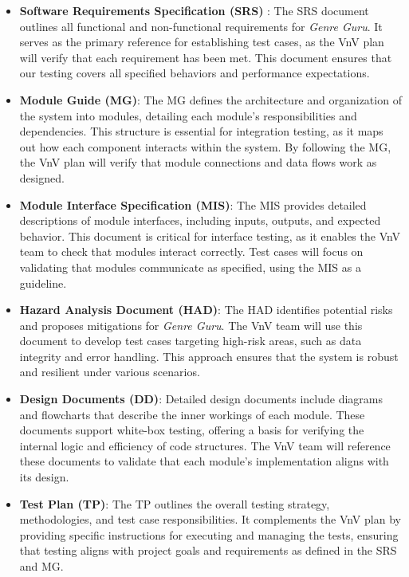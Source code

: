 \documentclass[12pt, titlepage]{article}
\begin{document}
\begin{itemize}
    \item \textbf{Software Requirements Specification (SRS)} \citep{SRS}: The SRS document outlines all functional and non-functional requirements for \textit{Genre Guru}. It serves as the primary reference for establishing test cases, as the VnV plan will verify that each requirement has been met. This document ensures that our testing covers all specified behaviors and performance expectations.

    \item \textbf{Module Guide (MG)}: The MG defines the architecture and organization of the system into modules, detailing each module's responsibilities and dependencies. This structure is essential for integration testing, as it maps out how each component interacts within the system. By following the MG, the VnV plan will verify that module connections and data flows work as designed.

    \item \textbf{Module Interface Specification (MIS)}: The MIS provides detailed descriptions of module interfaces, including inputs, outputs, and expected behavior. This document is critical for interface testing, as it enables the VnV team to check that modules interact correctly. Test cases will focus on validating that modules communicate as specified, using the MIS as a guideline.

    \item \textbf{Hazard Analysis Document (HAD)}: The HAD identifies potential risks and proposes mitigations for \textit{Genre Guru}. The VnV team will use this document to develop test cases targeting high-risk areas, such as data integrity and error handling. This approach ensures that the system is robust and resilient under various scenarios.

    \item \textbf{Design Documents (DD)}: Detailed design documents include diagrams and flowcharts that describe the inner workings of each module. These documents support white-box testing, offering a basis for verifying the internal logic and efficiency of code structures. The VnV team will reference these documents to validate that each module’s implementation aligns with its design.

    \item \textbf{Test Plan (TP)}: The TP outlines the overall testing strategy, methodologies, and test case responsibilities. It complements the VnV plan by providing specific instructions for executing and managing the tests, ensuring that testing aligns with project goals and requirements as defined in the SRS and MG.

\end{itemize}
\end{document}
